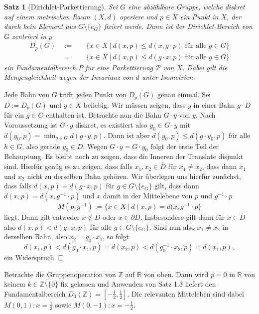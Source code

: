 \documentclass[11pt]{book}
\numberwithin{dummy}{section}
\newtheorem{theorem}{Satz}[section]
\theoremstyle{nonumberbreak}
\newenvironment{pr}[1][]{\ifthenelse{\equal{#1}{}}{\proof}{\proof[#1]}\rm}{\endproof}
\newenvironment{ex}[1][]{\ifthenelse{\equal{#1}{}}{\example}{\example[#1]}\rm}{\endexample}
\newcommand{\Z}{\mathbb{Z}}
\newcommand{\R}{\mathbb{R}}
\begin{document}
\begin{spacing}{1.4}
\begin{theorem}[Dirichlet-Parkettierung]
Sei $G$ eine abzählbare Gruppe, welche diskret auf einem metrischen Raum $(X,d)$ operiere und $p \in X$ ein Punkt in $X$, der durch kein Element aus $G \setminus \{e_G\}$ fixiert werde. Dann ist der \textit{Dirichlet-Bereich von $G$ zentriert in $p$}
\begin{alignat*}{5}
D_p(G) \ \ &:=&& \ \ \{ x \in X \ \vert \ d(x,p) \leqslant d(x,g\cdot p) \textrm{ für alle } g \in G\} \\
&=&& \ \ \{x \in X \ \vert \ d(x,p) \leqslant d(g\cdot x,p) \textrm{ für alle } g \in G\}
\end{alignat*}
ein Fundamentalbereich $P$ für eine Parkettierung $\mathcal{P}$ von $X$. Dabei gilt die Mengengleichheit wegen der Invarianz von $d$ unter Isometrien.
\end{theorem}
\begin{pr}[\textit{Bemerkung:}] Jede Bahn von $G$ trifft jeden Punkt von $\overset{\circ}{D_p(G)}$ genau einmal.
\end{pr}
\begin{pr}
Sei $D:=D_p(G)$ und $y \in X$ beliebig. Wir müssen zeigen, dass $y$ in einer Bahn $g\cdot D$ für ein $g \in G$ enthalten ist. Betrachte nun die Bahn $G\cdot y$ von $y$. Nach Voraussetzung ist $G \cdot y$ diskret, es existiert also $y_0 \in G \cdot y$ mit $d(y_0, p)  = \min_{g \in G} d(g \cdot y, p)$. Dann ist aber $d(y_0,p) \leqslant d(g \cdot y_0,p)$ für alle $h \in G$, also gerade $y_0 \in D$. Wegen $G \cdot y = G \cdot y_0$ folgt der erste Teil der Behauptung.
Es bleibt noch zu zeigen, dass die Inneren der Translate disjunkt sind. Hierfür genüg es zu zeigen, dass falls $x_1, x_2 \in \overset{\circ}{D}$ für $x_1 \neq x_2$, dass dann $x_1$ und $x_2$ nicht zu derselben Bahn gehören. Wir überlegen uns hierfür zunächst, dass falls $d(x,p) = d(g\cdot x,p)$ für $g \in G\setminus \{e_G\}$ gilt, dass dann $d(x,p) = d(x, g^{-1} \cdot p)$ und $x$ damit in der Mittelebene von $p$ und $g^{-1}\cdot p$
$$M(p,g^{-1}) := \{x \in X \ \vert \ d(x,p) = d(x,g^{-1} \cdot p\}$$
liegt. Dann gilt entweder $x \notin D$ oder $x \in \partial D$. Insbesondere gilt dann für $x \in \overset{\circ}{D}$ also $d(x,p)<d(g \cdot x, p)$ für alle $g \in G \setminus \{e_G\}$. Sind nun also $x_1 \neq x_2$ in derselben Bahn, also $x_2 = g_0 \cdot x_1$, so folgt 
$$d(x_1, p) < d(g_0 \cdot x_1,p) = d(x_2,p) < d(g_0^{-1} \cdot x_2, p) = d(x_1, p),$$
ein Widerspruch. $\hfill \Box$
\end{pr}


\begin{ex}
\begin{compactenum}
\item Betrachte die Gruppenoperation von $\Z$ auf $\R$ von oben. Dann wird $p=0$ in $\R$ von keinem $k \in \Z\setminus \{0\}$ fix gelassen und Anwenden von Satz 1.3 liefert den Fundamentalbereich $D_0(\Z) = \left[-\frac{1}{2}, \frac{1}{2}\right]$. Die relevanten Mitteleben sind dabei $M(0,1): x = \frac{1}{2}$ sowie $M(0,-1): x = -\frac{1}{2}$.


\end{compactenum}
\end{ex}
\end{spacing}
\end{document}
